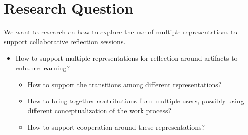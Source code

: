 \section{Research Question}
We want to research on how to explore the use of multiple representations to support collaborative reflection sessions.

\begin{itemize}
	\item How to support multiple representations for reflection around artifacts to enhance learning?
	\begin{itemize}
		\item How to support the transitions among different representations?
		\item How to bring together contributions from multiple users, possibly using different conceptualization of the work process? 
		\item How to support cooperation around these representations? 
	\end{itemize}
\end{itemize}